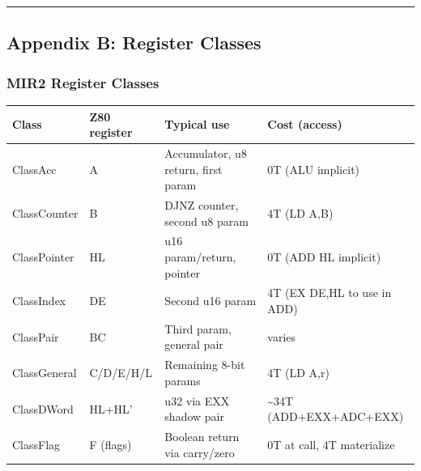 \documentclass[
  11pt,
  a4paper,
]{report}
\begin{document}
\begin{center}\rule{0.5\linewidth}{0.5pt}\end{center}

\subsection{Appendix B: Register
Classes}\label{appendix-b-register-classes}

\subsubsection{MIR2 Register Classes}\label{mir2-register-classes}

\begin{longtable}[]{@{}
  >{\raggedright\arraybackslash}p{}
  >{\raggedright\arraybackslash}p{}
  >{\raggedright\arraybackslash}p{}
  >{\raggedright\arraybackslash}p{}@{}}
\toprule\noalign{}
\begin{minipage}[b]{\linewidth}\raggedright
Class
\end{minipage} & \begin{minipage}[b]{\linewidth}\raggedright
Z80 register
\end{minipage} & \begin{minipage}[b]{\linewidth}\raggedright
Typical use
\end{minipage} & \begin{minipage}[b]{\linewidth}\raggedright
Cost (access)
\end{minipage} \\
\midrule\noalign{}
\endhead
\bottomrule\noalign{}
\endlastfoot
ClassAcc & A & Accumulator, u8 return, first param & 0T (ALU
implicit) \\
ClassCounter & B & DJNZ counter, second u8 param & 4T (LD A,B) \\
ClassPointer & HL & u16 param/return, pointer & 0T (ADD HL implicit) \\
ClassIndex & DE & Second u16 param & 4T (EX DE,HL to use in ADD) \\
ClassPair & BC & Third param, general pair & varies \\
ClassGeneral & C/D/E/H/L & Remaining 8-bit params & 4T (LD A,r) \\
ClassDWord & HL+HL' & u32 via EXX shadow pair & \textasciitilde34T
(ADD+EXX+ADC+EXX) \\
ClassFlag & F (flags) & Boolean return via carry/zero & 0T at call, 4T
materialize \\
\end{longtable}
\end{document}
